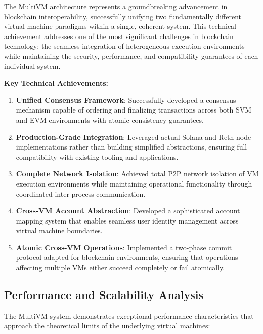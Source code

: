 \documentclass[11pt,a4paper]{article}
\begin{document}
The MultiVM architecture represents a groundbreaking advancement in blockchain interoperability, successfully unifying two fundamentally different virtual machine paradigms within a single, coherent system. This technical achievement addresses one of the most significant challenges in blockchain technology: the seamless integration of heterogeneous execution environments while maintaining the security, performance, and compatibility guarantees of each individual system.

\textbf{Key Technical Achievements:}

\begin{enumerate}
    \item \textbf{Unified Consensus Framework}: Successfully developed a consensus mechanism capable of ordering and finalizing transactions across both SVM and EVM environments with atomic consistency guarantees.
    
    \item \textbf{Production-Grade Integration}: Leveraged actual Solana and Reth node implementations rather than building simplified abstractions, ensuring full compatibility with existing tooling and applications.
    
    \item \textbf{Complete Network Isolation}: Achieved total P2P network isolation of VM execution environments while maintaining operational functionality through coordinated inter-process communication.
    
    \item \textbf{Cross-VM Account Abstraction}: Developed a sophisticated account mapping system that enables seamless user identity management across virtual machine boundaries.
    
    \item \textbf{Atomic Cross-VM Operations}: Implemented a two-phase commit protocol adapted for blockchain environments, ensuring that operations affecting multiple VMs either succeed completely or fail atomically.
\end{enumerate}

\subsection{Performance and Scalability Analysis}

The MultiVM system demonstrates exceptional performance characteristics that approach the theoretical limits of the underlying virtual machines:
\end{document}
